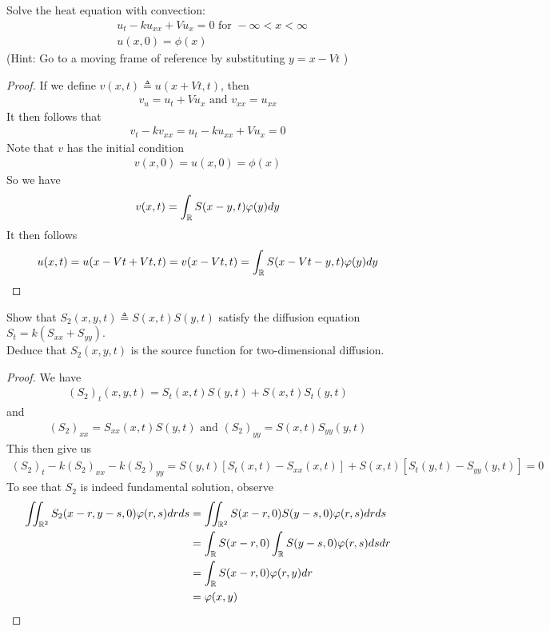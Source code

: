 \documentclass{report}
\begin{document}
\begin{question}{}{}
Solve the heat equation with convection: 
\begin{align*}
&u_t-ku_{xx}+Vu_x=0\text{ for }-\infty < x< \infty\\
&u(x,0)=\phi (x)
\end{align*}
(Hint: Go to a moving frame of reference by substituting $y=x-Vt$ )
\end{question}
\begin{proof}
If we define $v(x,t)\triangleq u(x+Vt,t)$, then 
\begin{align*}
v_u=u_t+Vu_x\text{ and }v_{xx}=u_{xx}
\end{align*}
It then follows that 
\begin{align*}
v_t-kv_{xx}=u_t-ku_{xx}+Vu_x=0
\end{align*}
Note that $v$ has the initial condition 
 \begin{align*}
v(x,0)=u(x,0)=\phi (x)
\end{align*}
So we have
\begin{align*}
v(x,t)=\int_{\mathbb{R}}S(x-y,t)\varphi (y)dy 
\end{align*}
It then follows 
\begin{align*}
u(x,t)=u(x-Vt+Vt,t)=v(x-Vt,t)=\int_{\mathbb{R}}S(x-Vt-y,t)\varphi (y)dy
\end{align*}
\end{proof}
\begin{question}{}{}
Show that $S_2(x,y,t)\triangleq S(x,t)S(y,t)$ satisfy the diffusion equation $S_t=k(S_{xx}+S_{yy})$. \\

Deduce that $S_2(x,y,t)$ is the source function for two-dimensional diffusion. 
\end{question}
\begin{proof}
We have 
\begin{align*}
  (S_2)_t(x,y,t)=S_t(x,t)S(y,t)+S(x,t)S_t(y,t)
\end{align*}
and 
\begin{align*}
  (S_2)_{xx}=S_{xx}(x,t)S(y,t)\text{ and }(S_2)_{yy}=S(x,t)S_{yy}(y,t)
\end{align*}
This then give us 
\begin{align*}
  (S_2)_t-k(S_2)_{xx}-k(S_2)_{yy}=S(y,t)[S_t(x,t)-S_{xx}(x,t)]+ S(x,t)[S_t(y,t)-S_{yy}(y,t)]=0 
\end{align*}
To see that $S_2$ is indeed fundamental solution, observe 
 \begin{align*}
\iint_{\mathbb{R}^2}S_2(x-r,y-s,0)\varphi (r,s)drds&= \iint_{\mathbb{R}^2}S(x-r,0)S(y-s,0)\varphi (r,s)drds\\
&=\int_{\mathbb{R}}S(x-r,0)\int_{\mathbb{R}}S(y-s,0)\varphi (r,s)dsdr\\
&=\int_{\mathbb{R}}S(x-r,0) \varphi (r,y)dr\\
&=\varphi (x,y)
\end{align*}
\end{proof}
\end{document}
